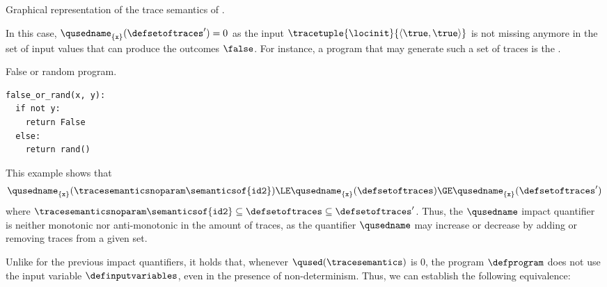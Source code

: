 \begin{example}
\begin{marginfigure}[*-6]
\caption{Graphical representation of the trace semantics of .}
\end{marginfigure}
In this case, $\qusedname_{\{\texttt{x} \}}(\defsetoftraces')=0$ as the input $\tracetuple{\locinit}{\langle \true, \true\rangle}$ is not missing anymore in the set of input values that can produce the outcomes $\false$.
For instance, a program that may generate such a set of traces is the .
\begin{marginlisting}
  \caption{False or random program.}
  \vspace{15pt}
\begin{lstlisting}[style=mystyle,language=customPython]
false_or_rand(x, y):
  if not y:
    return False
  else:
    return rand()
 \end{lstlisting}
\end{marginlisting}
This example shows that \[\qusedname_{\{\texttt{x} \}}(\tracesemanticsnoparam\semanticsof{\texttt{id2}}) \LE \qusedname_{\{\texttt{x} \}}(\defsetoftraces) \GE \qusedname_{\{\texttt{x} \}}(\defsetoftraces')\] where $\tracesemanticsnoparam\semanticsof{\texttt{id2}} \subseteq \defsetoftraces \subseteq \defsetoftraces'$.
Thus, the $\qusedname$ impact quantifier is neither monotonic nor anti-monotonic in the amount of traces, as the quantifier $\qusedname$ may increase or decrease by adding or removing traces from a given set.
\end{example}





Unlike for the previous impact quantifiers, it holds that, whenever $\qused(\tracesemantics)$ is 0, the program $\defprogram$ does not use the input variable $\definputvariables$, even in the presence of non-determinism.
Thus, we can establish the following equivalence:

